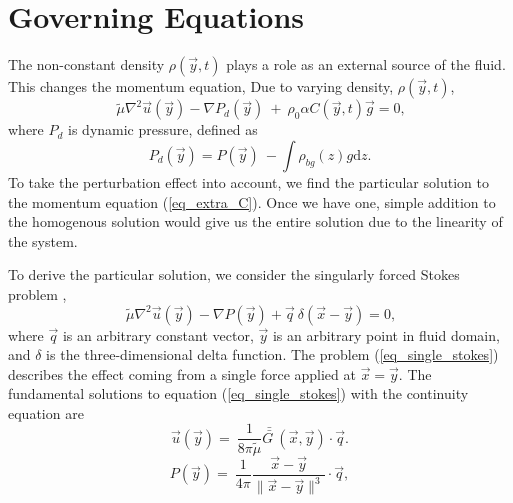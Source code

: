 \section{Governing Equations}
The non-constant density $\rho(\vec{y},t)$ plays a role as an external source of the fluid. This changes the momentum equation,
	Due to varying density, $\rho(\vec{y}, t)$, 
		 \begin{equation}
		\ \tilde{\mu}\nabla^2 \vec{u}(\vec{y})
		- \nabla P_d (\vec{y}) \ + \  
		 \rho_0 \alpha C(\vec{y},t) \vec{g} =0 , 
	\label{eq_extra_C}
	\end{equation}
	where $P_d$ is dynamic pressure, defined as
\begin{equation}
	P_d (\vec{y})
	 = P (\vec{y}) \ - \int \rho_{bg}(z) g   \textrm{d}z.
	\label{eq_Pd}
\end{equation}
To take the perturbation effect into account, we find the particular solution to the momentum equation (\ref{eq_extra_C}). Once we have one, simple addition to the homogenous solution would give us the entire solution due to the linearity of the system. 
\par
To derive the particular solution, we consider the singularly forced Stokes problem \cite{pozrikidis_boundary_1992},
\begin{equation}
	\ \tilde{\mu} \nabla^2 \vec{u}(\vec{y})
	- \nabla P (\vec{y})
	+\vec{q} \ \delta \left(\vec{x} - \vec{y} \right) =0,
\label{eq_single_stokes}
\end{equation}
where $\vec{q}$ is an arbitrary constant vector, $\vec{y}$ is an arbitrary point in fluid domain, and $\delta$ is the three-dimensional delta function.
The problem (\ref{eq_single_stokes}) 
describes the effect coming from a single force applied at $\vec{x} = \vec{y}.$
The fundamental solutions to equation (\ref{eq_single_stokes}) with the continuity equation are
\begin{equation}
	\vec{u} (\vec{y}) = \ \frac{1}{8\pi \tilde{\mu}}  \bar{\bar{G \ }}(\vec{x}, \vec{y})
	\cdot  \vec{q}.
\label{eq_fund_u}
\end{equation}
\begin{equation}
	P (\vec{y}) = \ \frac{1}{4\pi }  
	\frac{\vec{x} - \vec{y}}{\| \vec{x} - \vec{y}\|^3}
	\cdot  \vec{q},
\label{eq_fund_p}
\end{equation}

